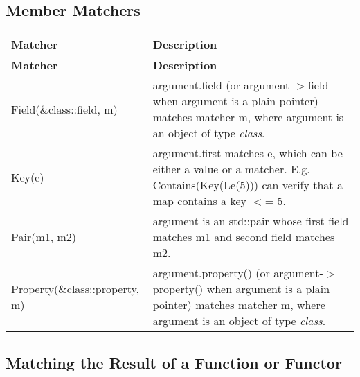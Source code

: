 \begin{DoxyCode}{0}
\DoxyCodeLine{\}}
\end{DoxyCode}


\subsection*{Member Matchers}

\tabulinesep=1mm
\begin{longtabu}spread 0pt [c]{*{2}{|X[-1]}|}
\hline
\cellcolor{\tableheadbgcolor}\textbf{ Matcher  }&\cellcolor{\tableheadbgcolor}\textbf{ Description   }\\
\endfirsthead
\hline
\endfoot
\hline
\cellcolor{\tableheadbgcolor}\textbf{ Matcher  }&\cellcolor{\tableheadbgcolor}\textbf{ Description   }\\
\endhead
{\ttfamily Field(\&class\+::field, m)}  &{\ttfamily argument.\+field} (or {\ttfamily argument-\/$>$field} when {\ttfamily argument} is a plain pointer) matches matcher {\ttfamily m}, where {\ttfamily argument} is an object of type {\itshape class}.   \\
{\ttfamily Key(e)}  &{\ttfamily argument.\+first} matches {\ttfamily e}, which can be either a value or a matcher. E.\+g. {\ttfamily Contains(Key(\+Le(5)))} can verify that a {\ttfamily map} contains a key {\ttfamily $<$= 5}.   \\
{\ttfamily Pair(m1, m2)}  &{\ttfamily argument} is an {\ttfamily std\+::pair} whose {\ttfamily first} field matches {\ttfamily m1} and {\ttfamily second} field matches {\ttfamily m2}.   \\
{\ttfamily Property(\&class\+::property, m)}  &{\ttfamily argument.\+property()} (or {\ttfamily argument-\/$>$property()} when {\ttfamily argument} is a plain pointer) matches matcher {\ttfamily m}, where {\ttfamily argument} is an object of type {\itshape class}.   \\
\end{longtabu}


\subsection*{Matching the Result of a Function or Functor}

